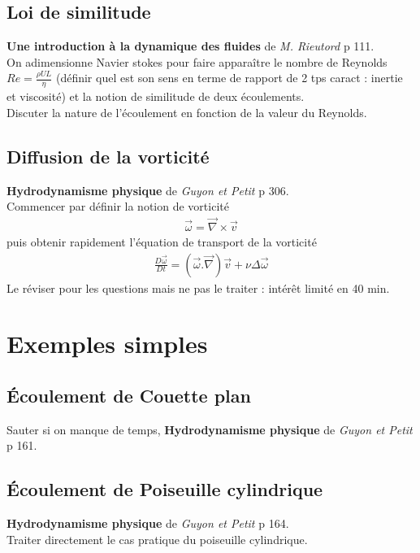 \documentclass[12pt,prb,aps,epsf]{article}
\begin{document}
\subsection{Loi de similitude}
\textbf{Une introduction à la dynamique des fluides} de \textit{M. Rieutord} p 111.\\ 
On adimensionne Navier stokes pour faire apparaître le nombre de Reynolds $Re =\frac{\rho U L}{\eta}$ (définir quel est son sens en terme de rapport de 2 tps caract : inertie et viscosité) et la notion de similitude de deux écoulements.\\
Discuter la nature de l'écoulement en fonction de la valeur du Reynolds.

\subsection{Diffusion de la vorticité}
\textbf{Hydrodynamisme physique} de \textit{Guyon et Petit} p 306.\\ 
Commencer par définir la notion de vorticité 
\begin{eqnarray}
\vec{\omega} = \vec{\nabla}\times \vec{v}
\end{eqnarray}
puis obtenir rapidement l'équation de transport de la vorticité
\begin{eqnarray}
\frac{D\vec{\omega}}{Dt} = (\vec{\omega}.\vec{\nabla})\vec{v} + \nu \Delta \vec{\omega}
\end{eqnarray}
Le réviser pour les questions mais ne pas le traiter : intérêt limité en 40 min.

\section{Exemples simples}
\subsection{Écoulement de Couette plan}
Sauter si on manque de temps, \textbf{Hydrodynamisme physique} de \textit{Guyon et Petit} p 161.

\subsection{Écoulement de Poiseuille cylindrique}
\textbf{Hydrodynamisme physique} de \textit{Guyon et Petit} p 164.\\ 
Traiter directement le cas pratique du poiseuille cylindrique. 
\end{document}
